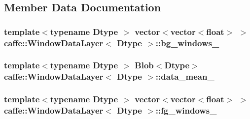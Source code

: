 \subsection{Member Data Documentation}
\hypertarget{classcaffe_1_1_window_data_layer_a9b25a230a66e8d289f02c2d872fc816c}{
\subsubsection[{bg\+\_\+windows\+\_\+}]{\setlength{\rightskip}{0pt plus 5cm}template$<$typename Dtype $>$ vector$<$vector$<$float$>$ $>$ {\bf caffe\+::\+Window\+Data\+Layer}$<$ Dtype $>$\+::bg\+\_\+windows\+\_\+\hspace{0.3cm}{\ttfamily [protected]}}}\label{classcaffe_1_1_window_data_layer_a9b25a230a66e8d289f02c2d872fc816c}
\hypertarget{classcaffe_1_1_window_data_layer_a35f69e1d231f036c4a1718eb89ade23f}{
\subsubsection[{data\+\_\+mean\+\_\+}]{\setlength{\rightskip}{0pt plus 5cm}template$<$typename Dtype $>$ {\bf Blob}$<$Dtype$>$ {\bf caffe\+::\+Window\+Data\+Layer}$<$ Dtype $>$\+::data\+\_\+mean\+\_\+\hspace{0.3cm}{\ttfamily [protected]}}}\label{classcaffe_1_1_window_data_layer_a35f69e1d231f036c4a1718eb89ade23f}
\hypertarget{classcaffe_1_1_window_data_layer_ac78c9c3671b5116a432c221ebd2c656f}{
\subsubsection[{fg\+\_\+windows\+\_\+}]{\setlength{\rightskip}{0pt plus 5cm}template$<$typename Dtype $>$ vector$<$vector$<$float$>$ $>$ {\bf caffe\+::\+Window\+Data\+Layer}$<$ Dtype $>$\+::fg\+\_\+windows\+\_\+\hspace{0.3cm}{\ttfamily [protected]}}}\label{classcaffe_1_1_window_data_layer_ac78c9c3671b5116a432c221ebd2c656f}
